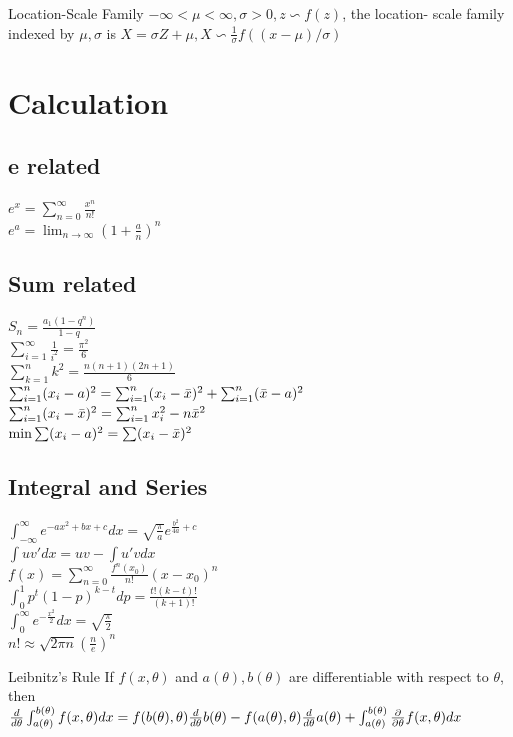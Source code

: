 \documentclass{article}
\begin{document}
\begin{multicols*}{3}
\begin{thmbox}{Location-Scale Family}
    $-\infty < \mu < \infty, \sigma > 0, z \backsim f(z)$, the location- scale family indexed by $\mu, \sigma$ is $X = \sigma Z + \mu , X \backsim \frac{1}{\sigma}f((x - \mu)/\sigma)$
\end{thmbox}


\section{Calculation}
\subsection{e related}
$e^x = \sum^{\infty}_{n = 0}\frac{x^n}{n!}$\\
$e^a =  \lim_{n \to \infty}(1+\frac{a}{n})^n$


\subsection{Sum related}
$S_n = \frac{a_1(1-q^n)}{1-q}$\\
$\sum^{\infty}_{i =1}\frac{1}{i^2} = \frac{\pi^2}{6}$\\
$\sum^{n}_{k = 1}k^2 = \frac{n(n+1)(2n+1)}{6}$\\
$\sum^{n}_{i = 1}(x_i - a)^2 = \sum^{n}_{i = 1}(x_i - \Bar{x})^2 + \sum^{n}_{i =1}(\Bar{x} - a)^2$\\
$ \sum^{n}_{i = 1}(x_i - \Bar{x})^2 = \sum^{n}_{i = 1}x_i^2 - n\Bar{x}^2$\\
$\min\sum(x_i -a)^2 = \sum(x_i - \Bar{x})^2$

\subsection{Integral and Series}
$ \int^{\infty}_{-\infty}e^{-ax^2+bx+c}dx = \sqrt{\frac{\pi}{a}}e^{\frac{b^2}{4a}+c}$\\
$\int uv'dx = uv - \int u'vdx$\\
$ f(x) = \sum^{\infty}_{n=0}\frac{f^{n}(x_0)}{n!}(x-x_0)^n$\\
$\int^{1}_{0}p^{t}(1-p)^{k-t}dp = \frac{t!(k-t)!}{(k+1)!}$\\
$ \int^{\infty}_{0}e^{-\frac{x^2}{2}}dx = \sqrt{\frac{\pi}{2}}$\\
$ n! \approx \sqrt{2\pi n}(\frac{n}{e})^n$\\
\begin{thmbox}{Leibnitz's Rule}
If $f(x,\theta)$ and $a(\theta), b(\theta)$ are differentiable with respect to $\theta$, then\\
$\frac{d}{d\theta}\int^{b(\theta)}_{a(\theta)}f(x,\theta)dx = f(b(\theta),\theta)\frac{d}{d\theta}b(\theta) - \\f(a(\theta),\theta)\frac{d}{d\theta}a(\theta) +
\int^{b(\theta)}_{a(\theta)}\frac{\partial}{\partial\theta}f(x,\theta)dx$
\end{thmbox}

\end{multicols*}
\end{document}
